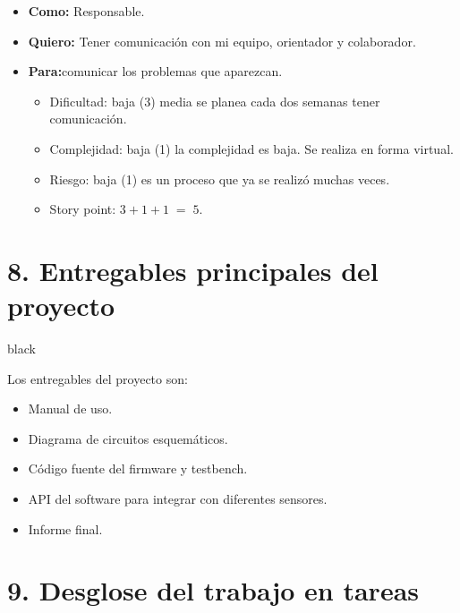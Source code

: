 \documentclass[
11pt, %
codirector, %
]{charter}
\begin{document}
\begin{itemize}
\item\textbf{Como:} Responsable.
\item \textbf{Quiero:} Tener comunicación con mi equipo, orientador y colaborador.
\item \textbf{Para:}comunicar los problemas que aparezcan.
\begin{itemize}
\item Dificultad: baja (3) media se planea cada dos semanas tener comunicación.
\item Complejidad: baja (1) la complejidad es baja. Se realiza en forma virtual.
\item Riesgo: baja (1) es un proceso que ya se realizó muchas veces.
\item Story point: $3+1+1\;=\;5$.
\end{itemize}
\end{itemize}

\section{8. Entregables principales del proyecto}
\label{sec:entregables}

\begin{consigna}{black}

Los entregables del proyecto son:

\begin{itemize}
	\item Manual de uso.
	\item Diagrama de circuitos esquemáticos.
	\item Código fuente del firmware y testbench.
	\item API del software para integrar con diferentes sensores.
	\item Informe final.
\end{itemize}

\end{consigna}

\section{9. Desglose del trabajo en tareas}
\label{sec:wbs}
\end{document}
